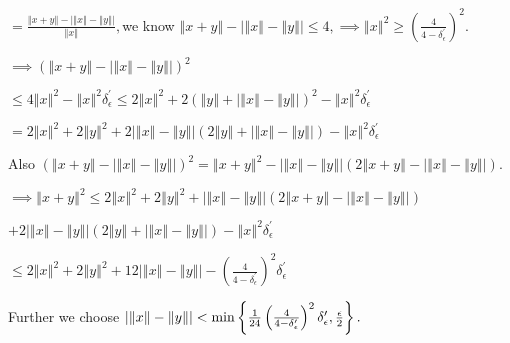 \documentclass{article}
\begin{document}
$=\frac{\left\Vert x+y\right\Vert -\left\vert \left\Vert x\right\Vert
-\left\Vert y\right\Vert \right\vert }{\left\Vert x\right\Vert },$we know $%
\left\Vert x+y\right\Vert -\left\vert \left\Vert x\right\Vert -\left\Vert
y\right\Vert \right\vert \leq 4,\implies \left\Vert x\right\Vert ^{2}\geq
\left( \frac{4}{4-\delta _{\epsilon }^{\prime }}\right) ^{2}.$

$\implies \left( \left\Vert x+y\right\Vert -\left\vert \left\Vert
x\right\Vert -\left\Vert y\right\Vert \right\vert \right) ^{2}$

$\leq 4\left\Vert x\right\Vert ^{2}-\left\Vert x\right\Vert ^{2}\delta
_{\epsilon }^{\prime }\leq 2\left\Vert x\right\Vert ^{2}+2\left( \left\Vert
y\right\Vert +\left\vert \left\Vert x\right\Vert -\left\Vert y\right\Vert
\right\vert \right) ^{2}-\left\Vert x\right\Vert ^{2}\delta _{\epsilon
}^{\prime }$

$=2\left\Vert x\right\Vert ^{2}+2\left\Vert y\right\Vert ^{2}+2\left\vert
\left\Vert x\right\Vert -\left\Vert y\right\Vert \right\vert \left(
2\left\Vert y\right\Vert +\left\vert \left\Vert x\right\Vert -\left\Vert
y\right\Vert \right\vert \right) -\left\Vert x\right\Vert ^{2}\delta
_{\epsilon }^{\prime }$

Also $\left( \left\Vert x+y\right\Vert -\left\vert \left\Vert x\right\Vert
-\left\Vert y\right\Vert \right\vert \right) ^{2}=\left\Vert x+y\right\Vert
^{2}-\left\vert \left\Vert x\right\Vert -\left\Vert y\right\Vert \right\vert
\left( 2\left\Vert x+y\right\Vert -\left\vert \left\Vert x\right\Vert
-\left\Vert y\right\Vert \right\vert \right) .$

\bigskip $\implies \left\Vert x+y\right\Vert ^{2}\leq 2\left\Vert
x\right\Vert ^{2}+2\left\Vert y\right\Vert ^{2}+\left\vert \left\Vert
x\right\Vert -\left\Vert y\right\Vert \right\vert \left( 2\left\Vert
x+y\right\Vert -\left\vert \left\Vert x\right\Vert -\left\Vert y\right\Vert
\right\vert \right) $

$+2\left\vert \left\Vert x\right\Vert -\left\Vert y\right\Vert \right\vert
\left( 2\left\Vert y\right\Vert +\left\vert \left\Vert x\right\Vert
-\left\Vert y\right\Vert \right\vert \right) -\left\Vert x\right\Vert
^{2}\delta _{\epsilon }^{\prime }$

$\leq 2\left\Vert x\right\Vert ^{2}+2\left\Vert y\right\Vert
^{2}+12\left\vert \left\Vert x\right\Vert -\left\Vert y\right\Vert
\right\vert -\left( \frac{4}{4-\delta _{\epsilon }^{\prime }}\right)
^{2}\delta _{\epsilon }^{\prime }$

Further we choose $\left\vert \left\Vert x\right\Vert -\left\Vert
y\right\Vert \right\vert <\min \left\{ \frac{1}{24}\left( \frac{4}{4-\delta
_{\epsilon }^{\prime }}\right) ^{2}\delta _{\epsilon }^{\prime },\frac{%
\epsilon }{2}\right\} .$
\end{document}
